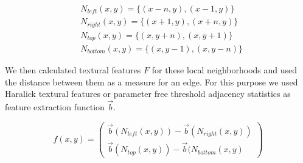 \documentclass[pdftex,12pt,a4paper]{report}
\begin{document}
\begin{equation}
\begin{split}
	& N_{left}(x,y) = \{ (x-n,y), (x-1,y) \} \\
	& N_{right}(x,y) = \{ (x+1,y), (x+n,y) \} \\
	& N_{top}(x,y) = \{ (x,y+n), (x,y+1) \} \\
	& N_{bottom}(x,y) = \{ (x,y-1), (x,y-n) \}
\end{split}
\end{equation}

We then calculated textural features $F$ for these local neighborhoods and used the distance between them as a measure for an edge. For this purpose we used Haralick textural features \cite{haralick1973textural} or parameter free threshold adjacency statistics \cite{hamilton2007fast} as feature extraction function $\vec{b}$.  

\begin{equation}
f(x,y) = \left( \begin{array}{c}
\vec{b}(N_{left}(x,y)) - \vec{b}(N_{right}(x,y)) \\
\vec{b}(N_{top}(x,y)) - \vec{b}(N_{bottom}(x,y)
\end{array} \right)
\end{equation}
\end{document}

